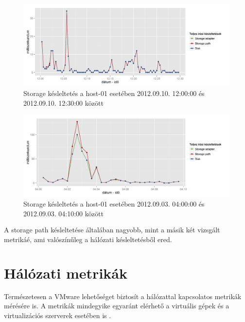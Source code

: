 \documentclass[a4paper,10pt,titlepage]{article}
\begin{document}
\begin{figure}[ht!]
\centering
\includegraphics[width=1.00\textwidth]{figures/disk_metrics_storage_latency-20120910120000-20120910123000.png}
\caption{ Storage késleltetés a host-01 esetében 2012.09.10. 12:00:00 és 2012.09.10. 12:30:00 között \label{fig:disk_metrics_storage_latency-02}}
\end{figure}

\begin{figure}[ht!]
\centering
\includegraphics[width=1.00\textwidth]{figures/disk_metrics_storage_latency-20120903040000-20120903041000.png}
\caption{ Storage késleltetés a host-01 esetében 2012.09.03. 04:00:00 és 2012.09.03. 04:10:00 között \label{fig:disk_metrics_storage_latency-03}}
\end{figure}

A storage path késleltetése általában nagyobb, mint a másik két vizsgált metrikáé, ami valószínűleg a hálózati késleltetésből ered.


\section{Hálózati metrikák}

Természetesen a VMware lehetőséget biztosít a hálózattal kapcsolatos metrikák mérésére is. A metrikák mindegyike egyaránt elérhető a virtuális gépek és a virtualizációs szerverek esetében is \cite{link:NC}.
\end{document}
